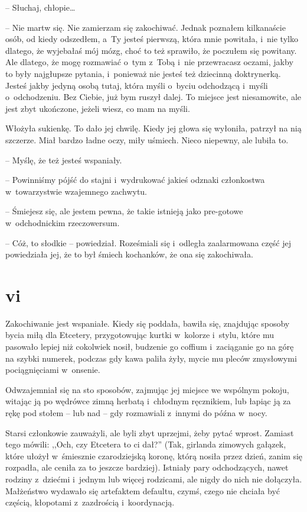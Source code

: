 \documentclass[oneside,polish,11pt,sfheadings]{mwbk}
\begin{document}
-- Słuchaj, chłopie\ldots 

-- Nie martw się. Nie zamierzam się zakochiwać. Jednak poznałem
kilkanaście osób, od kiedy odszedłem, a~Ty jesteś pierwszą, która mnie
powitała, i~nie tylko dlatego, że wyjebałaś mój mózg, choć to też
sprawiło, że poczułem się powitany. Ale dlatego, że mogę rozmawiać o~tym z~Tobą i~nie przewracasz oczami, jakby to były najgłupsze pytania, i~ponieważ nie jesteś też dziecinną doktrynerką. Jesteś jakby jedyną osobą
tutaj, która myśli o~byciu odchodzącą i~myśli o~odchodzeniu. Bez Ciebie,
już bym ruszył dalej. To miejsce jest niesamowite, ale jest zbyt
ukończone, jeżeli wiesz, co mam na myśli.

Włożyła sukienkę. To dało jej chwilę. Kiedy jej głowa się wyłoniła,
patrzył na nią szczerze. Miał bardzo ładne oczy, miły uśmiech. Nieco
niepewny, ale lubiła to.

-- Myślę, że też jesteś wspaniały.

-- Powinniśmy pójść do stajni i~wydrukować jakieś odznaki członkostwa w~towarzystwie wzajemnego zachwytu.

-- Śmiejesz się, ale jestem pewna, że takie istnieją jako pre-gotowe w~odchodnickim rzeczowersum.

-- Cóż, to słodkie -- powiedział. Roześmiali się i~odległa zaalarmowana
część jej powiedziała jej, że to był śmiech kochanków, że ona się
zakochiwała.

\chapter*{vi}

Zakochiwanie jest wspaniałe. Kiedy się poddała, bawiła się, znajdując
sposoby bycia miłą dla Etcetery, przygotowując kurtki w~kolorze i~stylu,
które mu pasowało lepiej niż cokolwiek nosił, budzenie go coffium i~zaciąganie go na górę na szybki numerek, podczas gdy kawa paliła żyły,
mycie mu pleców zmysłowymi pociągnięciami w~onsenie.

Odwzajemniał się na sto sposobów, zajmując jej miejsce we wspólnym
pokoju, witając ją po wędrówce zimną herbatą i~chłodnym ręcznikiem, lub
łapiąc ją za rękę pod stołem -- lub nad -- gdy rozmawiali z~innymi do
późna w~nocy.

Starsi członkowie zauważyli, ale byli zbyt uprzejmi, żeby pytać wprost.
Zamiast tego mówili: ,,Och, czy Etcetera to ci dał?'' (Tak, girlanda
zimowych gałązek, które ułożył w~śmiesznie czarodziejską koronę, którą
nosiła przez dzień, zanim się rozpadła, ale ceniła za to jeszcze
bardziej). Istniały pary odchodzących, nawet rodziny z~dziećmi i~jednym
lub więcej rodzicami, ale nigdy do nich nie dołączyła. Małżeństwo
wydawało się artefaktem defaultu, czymś, czego nie chciała być częścią,
kłopotami z~zazdrością i~koordynacją.
\end{document}

